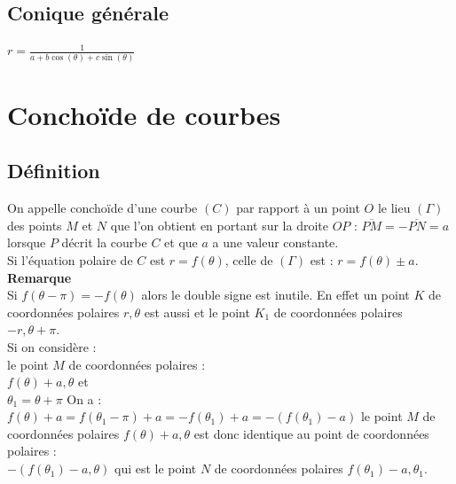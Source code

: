 \documentclass[a4paper,11pt]{book}
\begin{document}
\subsection{Conique g\'en\'erale}
$\displaystyle r=\frac{1}{a+b\cos(\theta)+c\sin(\theta)}$
\section{Concho\"{i}de de courbes}
\subsection{D\'efinition}
On appelle concho\"{i}de d'une courbe $(C)$ par rapport \`a un point $O$ le 
lieu $(\Gamma)$ des points $M$ et $N$ que l'on obtient en portant sur la 
droite $OP$ : $\overline{PM}=-\overline{PN}=a$ lorsque $P$ d\'ecrit la courbe 
$C$ et que $a$ a une valeur constante.\\
Si l'\'equation polaire de $C$ est $r=f(\theta)$, celle de $(\Gamma)$ est :
$r=f(\theta)\pm a$.\\
{\bf Remarque}\\
Si $f(\theta-\pi)=-f(\theta)$ alors le double signe est inutile. En effet 
un point $K$ de coordonn\'ees polaires $r,\theta$ est aussi 
et le point $K_1$ de coordonn\'ees polaires $-r,\theta+\pi$.\\
Si on consid\`ere :\\
le point $M$ de coordonn\'ees polaires :\\
$f(\theta)+a,\theta$  et \\
$\theta_1=\theta+\pi$
On a :\\
$f(\theta)+a=f(\theta_1-\pi)+a=-f(\theta_1)+a=-(f(\theta_1)-a)$
le point $M$  de coordonn\'ees polaires $f(\theta)+a,\theta$
est donc identique au point de coordonn\'ees polaires :\\
$-(f(\theta_1)-a,\theta)$ qui est le  point  $N$ de coordonn\'ees 
polaires $f(\theta_1)-a,\theta_1$.
\end{document}
